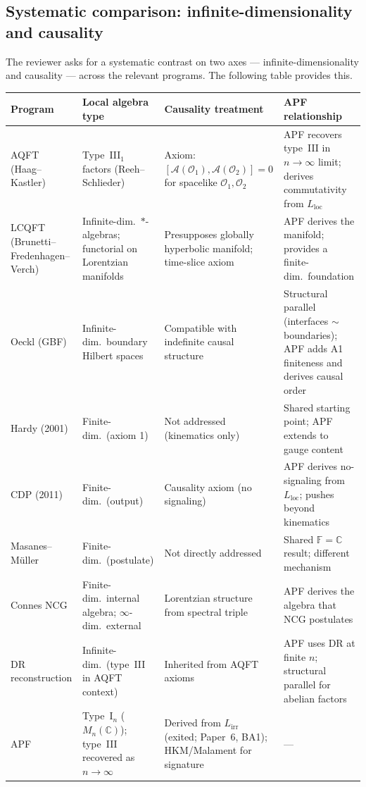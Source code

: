 \documentclass[11pt]{article}
\theoremstyle{definition}
\begin{document}
\subsection{Systematic comparison: infinite-dimensionality and causality}
\label{sec:systematic_comparison}

The reviewer asks for a systematic contrast on two axes ---
infinite-dimensionality and causality --- across the relevant
programs.  The following table provides this.

\smallskip
\begin{center}\footnotesize
\renewcommand{\arraystretch}{1.25}
\begin{tabular}{@{}p{2.4cm}p{3.2cm}p{3.2cm}p{3.5cm}@{}}
\toprule
\textbf{Program} & \textbf{Local algebra type} &
  \textbf{Causality treatment} & \textbf{APF relationship} \\
\midrule
AQFT (Haag--Kastler) &
  Type~III$_1$ factors (Reeh--Schlieder) &
  Axiom: $[\mathcal{A}(\mathcal{O}_1), \mathcal{A}(\mathcal{O}_2)] = 0$ for spacelike $\mathcal{O}_1, \mathcal{O}_2$ &
  APF recovers type~III in $n \to \infty$ limit; derives commutativity from $L_{\mathrm{loc}}$ \\[3pt]
LCQFT (Brunetti--Fredenhagen--Verch) &
  Infinite-dim.\ $*$-algebras; functorial on Lorentzian manifolds &
  Presupposes globally hyperbolic manifold; time-slice axiom &
  APF derives the manifold; provides a finite-dim.\ foundation \\[3pt]
Oeckl (GBF) &
  Infinite-dim.\ boundary Hilbert spaces &
  Compatible with indefinite causal structure &
  Structural parallel (interfaces $\sim$ boundaries); APF adds A1 finiteness and derives causal order \\[3pt]
Hardy (2001) &
  Finite-dim.\ (axiom 1) &
  Not addressed (kinematics only) &
  Shared starting point; APF extends to gauge content \\[3pt]
CDP (2011) &
  Finite-dim.\ (output) &
  Causality axiom (no signaling) &
  APF derives no-signaling from $L_{\mathrm{loc}}$; pushes beyond kinematics \\[3pt]
Masanes--M\"uller &
  Finite-dim.\ (postulate) &
  Not directly addressed &
  Shared $\mathbb{F} = \mathbb{C}$ result; different mechanism \\[3pt]
Connes NCG &
  Finite-dim.\ internal algebra; $\infty$-dim.\ external &
  Lorentzian structure from spectral triple &
  APF derives the algebra that NCG postulates \\[3pt]
DR reconstruction &
  Infinite-dim.\ (type~III in AQFT context) &
  Inherited from AQFT axioms &
  APF uses DR at finite $n$; structural parallel for abelian factors \\[3pt]
APF &
  Type~I$_n$ ($M_n(\mathbb{C})$); type~III recovered as $n \to \infty$ &
  Derived from $L_{\mathrm{irr}}$ (exited; Paper~6, BA1); HKM/Malament for signature &
  --- \\
\bottomrule
\end{tabular}
\end{center}
\end{document}
